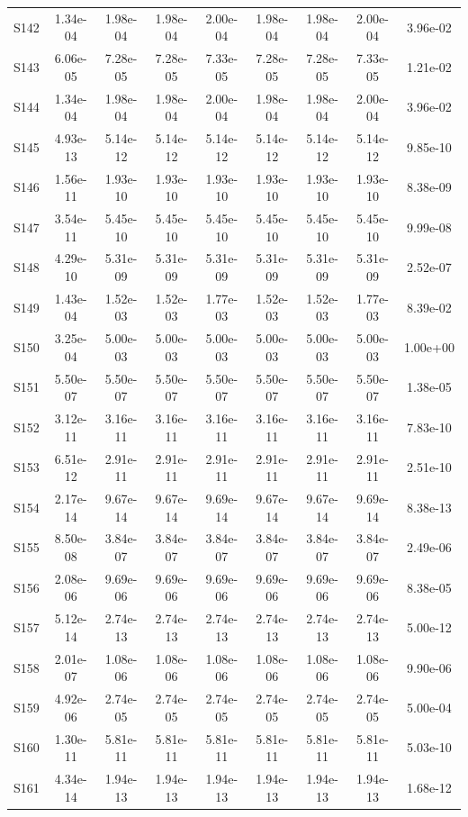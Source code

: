 {\begin{longtable}{l S[table-format=1.2e+2] S[table-format=1.2e+2] S[table-format=1.2e+2] S[table-format=1.2e+2] S[table-format=1.2e+2] S[table-format=1.2e+2] S[table-format=1.2e+2] S[table-format=1.2e+2]}
S142 & 1.34e-04 & 1.98e-04 & 1.98e-04 & 2.00e-04 & 1.98e-04 & 1.98e-04 & 2.00e-04 & 3.96e-02 \\
S143 & 6.06e-05 & 7.28e-05 & 7.28e-05 & 7.33e-05 & 7.28e-05 & 7.28e-05 & 7.33e-05 & 1.21e-02 \\
S144 & 1.34e-04 & 1.98e-04 & 1.98e-04 & 2.00e-04 & 1.98e-04 & 1.98e-04 & 2.00e-04 & 3.96e-02 \\
S145 & 4.93e-13 & 5.14e-12 & 5.14e-12 & 5.14e-12 & 5.14e-12 & 5.14e-12 & 5.14e-12 & 9.85e-10 \\
S146 & 1.56e-11 & 1.93e-10 & 1.93e-10 & 1.93e-10 & 1.93e-10 & 1.93e-10 & 1.93e-10 & 8.38e-09 \\
S147 & 3.54e-11 & 5.45e-10 & 5.45e-10 & 5.45e-10 & 5.45e-10 & 5.45e-10 & 5.45e-10 & 9.99e-08 \\
S148 & 4.29e-10 & 5.31e-09 & 5.31e-09 & 5.31e-09 & 5.31e-09 & 5.31e-09 & 5.31e-09 & 2.52e-07 \\
S149 & 1.43e-04 & 1.52e-03 & 1.52e-03 & 1.77e-03 & 1.52e-03 & 1.52e-03 & 1.77e-03 & 8.39e-02 \\
S150 & 3.25e-04 & 5.00e-03 & 5.00e-03 & 5.00e-03 & 5.00e-03 & 5.00e-03 & 5.00e-03 & 1.00e+00 \\
S151 & 5.50e-07 & 5.50e-07 & 5.50e-07 & 5.50e-07 & 5.50e-07 & 5.50e-07 & 5.50e-07 & 1.38e-05 \\
S152 & 3.12e-11 & 3.16e-11 & 3.16e-11 & 3.16e-11 & 3.16e-11 & 3.16e-11 & 3.16e-11 & 7.83e-10 \\
S153 & 6.51e-12 & 2.91e-11 & 2.91e-11 & 2.91e-11 & 2.91e-11 & 2.91e-11 & 2.91e-11 & 2.51e-10 \\
S154 & 2.17e-14 & 9.67e-14 & 9.67e-14 & 9.69e-14 & 9.67e-14 & 9.67e-14 & 9.69e-14 & 8.38e-13 \\
S155 & 8.50e-08 & 3.84e-07 & 3.84e-07 & 3.84e-07 & 3.84e-07 & 3.84e-07 & 3.84e-07 & 2.49e-06 \\
S156 & 2.08e-06 & 9.69e-06 & 9.69e-06 & 9.69e-06 & 9.69e-06 & 9.69e-06 & 9.69e-06 & 8.38e-05 \\
S157 & 5.12e-14 & 2.74e-13 & 2.74e-13 & 2.74e-13 & 2.74e-13 & 2.74e-13 & 2.74e-13 & 5.00e-12 \\
S158 & 2.01e-07 & 1.08e-06 & 1.08e-06 & 1.08e-06 & 1.08e-06 & 1.08e-06 & 1.08e-06 & 9.90e-06 \\
S159 & 4.92e-06 & 2.74e-05 & 2.74e-05 & 2.74e-05 & 2.74e-05 & 2.74e-05 & 2.74e-05 & 5.00e-04 \\
S160 & 1.30e-11 & 5.81e-11 & 5.81e-11 & 5.81e-11 & 5.81e-11 & 5.81e-11 & 5.81e-11 & 5.03e-10 \\
S161 & 4.34e-14 & 1.94e-13 & 1.94e-13 & 1.94e-13 & 1.94e-13 & 1.94e-13 & 1.94e-13 & 1.68e-12 \\

\end{longtable}}
